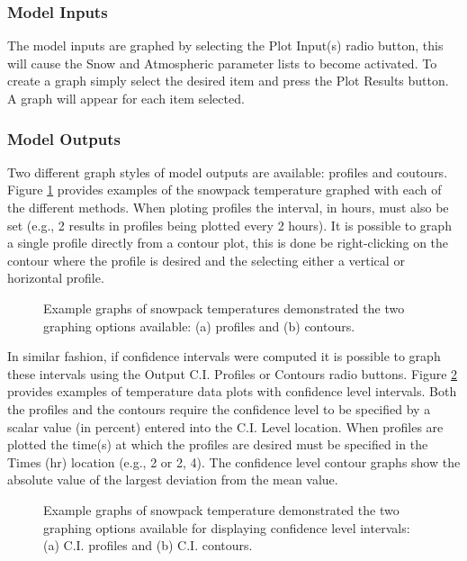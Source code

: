 \subsubsection{Model Inputs}
The model inputs are graphed by selecting the Plot Input(s) radio button, this will cause the Snow and Atmospheric parameter lists to become activated. To create a graph simply select the desired item and press the Plot Results button. A graph will appear for each item selected. 

\subsubsection{Model Outputs}
Two different graph styles of model outputs are available: profiles and coutours.  Figure \ref{TM:fig:example} provides examples of the snowpack temperature graphed with each of the different methods.  When ploting profiles the interval, in hours, must also be set (e.g., 2 results in profiles being plotted every 2 hours). It is possible to graph a single profile directly from a contour plot, this is done be right-clicking on the contour where the profile is desired and the selecting either a vertical or horizontal profile. 

\begin{figure}[ht!]\centering
{}\quad
{}\quad
\caption{Example graphs of snowpack temperatures demonstrated the two graphing options available: (a) profiles and (b) contours.}
\label{TM:fig:example}
\end{figure}

In similar fashion, if confidence intervals were computed it is possible to graph these intervals using the Output C.I. Profiles or Contours radio buttons.  Figure \ref{TM:fig:ciexample} provides examples of temperature data plots with confidence level intervals.  Both the profiles and the contours require the confidence level to be specified by a scalar value (in percent) entered into the C.I. Level location.  When profiles are plotted the time(s) at which the profiles are desired must be specified in the Times (hr) location (e.g., 2 or 2, 4).  The confidence level contour graphs show the absolute value of the largest deviation from the mean value.

\begin{figure}[ht!]\centering
{}\quad
{}\quad
\caption{Example graphs of snowpack temperature demonstrated the two graphing options available for displaying confidence level intervals: (a) C.I. profiles and (b) C.I. contours.}
\label{TM:fig:ciexample}
\end{figure}


